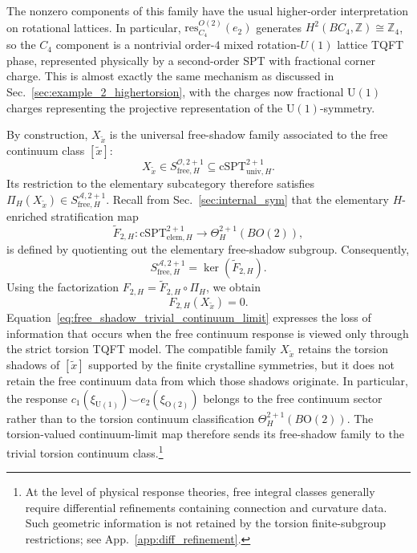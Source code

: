 \documentclass[aps,prx,reprint,superscriptaddress,twocolumn,amsmath,amssymb,amsfonts, nofootinbib]{revtex4-2}
\newcommand{\U}{\text{U}}
\newcommand{\res}{\text{res}}
\theoremstyle{apsstyle}
\begin{document}
\smallskip 

\noindent The nonzero components of this family have the usual higher-order interpretation on rotational lattices. In particular, $\res^{O(2)}_{C_4}(e_2)$ generates $H^{2}(BC_4,\mathbb Z)\cong\mathbb Z_4$, so the $C_4$ component is a nontrivial order-$4$ mixed rotation-$U(1)$ lattice TQFT phase, represented physically by a second-order SPT with fractional corner charge. This is almost exactly the same mechanism as discussed in Sec.~\ref{sec:example_2_highertorsion}, with the charges now fractional $\U(1)$ charges representing the projective representation of the $\U(1)$-symmetry. 

\bigskip 

By construction, $X_{\widetilde x}$ is the universal free-shadow family associated to the free continuum class $[\widetilde x]$:
\begin{equation*}
X_{\widetilde x} \in
S_{\mathrm{free},H}^{\mathcal O, 2+1} \subseteq \mathrm{cSPT}^{2+1}_{\mathrm{univ},H}.
\end{equation*}
Its restriction to the elementary subcategory therefore satisfies $\Pi_H(X_{\widetilde x}) \in S_{\mathrm{free},H}^{\mathcal A, 2+1}$. Recall from Sec.~\ref{sec:internal_sym} that the elementary
$H$-enriched stratification map
\begin{equation*}
\widetilde F_{2,H}: \mathrm{cSPT}^{2+1}_{\mathrm{elem},H} \longrightarrow \Theta_H^{2+1}(BO(2)),
\end{equation*}
is defined by quotienting out the elementary free-shadow subgroup. Consequently,
\begin{equation*}
S_{\mathrm{free},H}^{\mathcal A, 2+1} = \ker(\widetilde F_{2,H}).
\end{equation*}
Using the factorization $F_{2,H} = \widetilde F_{2,H}\circ\Pi_H$, we obtain
\begin{equation}
F_{2,H}(X_{\widetilde x})=0.
\label{eq:free_shadow_trivial_continuum_limit}
\end{equation}
Equation~\eqref{eq:free_shadow_trivial_continuum_limit} expresses the loss of information that occurs when the free continuum response is viewed only through the strict torsion TQFT model. The compatible family $X_{\widetilde x}$ retains the torsion shadows of $[\widetilde x]$ supported by the finite crystalline symmetries, but it does not retain the free continuum data from which those shadows originate. In particular, the response $c_1(\xi_{\U(1)})\smile e_2(\xi_{\mathrm O(2)})$ belongs to the free continuum sector rather than to the torsion continuum classification $\Theta_H^{2+1}(B\mathrm O(2))$. The torsion-valued continuum-limit map therefore sends its free-shadow family to the trivial torsion continuum class.\footnote{At the level of physical response theories, free integral classes generally require differential refinements containing connection and curvature data. Such geometric information is not retained by the torsion finite-subgroup restrictions; see App.~\ref{app:diff_refinement}.}
\end{document}
